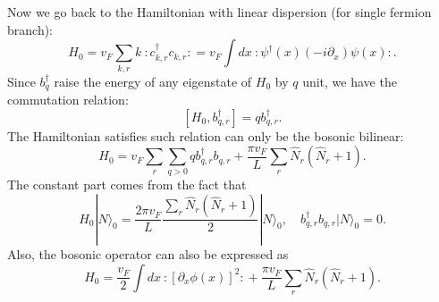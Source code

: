 Now we go back to the Hamiltonian with linear dispersion (for single fermion branch):
\begin{equation}
	H_0 = v_F \sum_{k,r} k\ {:\mathrel{c_{k,r}^\dagger c_{k,r}}:} 
	= v_F \int dx\ {:\mathrel{\psi^\dagger(x)(-i\partial_x)\psi(x)}:}.
\end{equation}
Since $b_q^\dagger$ raise the energy of any eigenstate of $H_0$ by $q$ unit, we have the commutation relation:
\begin{equation}
	\left[H_0,b_{q,r}^\dagger\right] = q b_{q,r}^\dagger.
\end{equation}
The Hamiltonian satisfies such relation can only be the bosonic bilinear:
\begin{equation}
	H_0 = v_F \sum_{r}\sum_{q>0} q b_{q,r}^\dagger b_{q,r} + \frac{\pi v_F}{L} \sum_r \hat{N}_r(\hat{N}_r+1).
\end{equation}
The constant part comes from the fact that
\begin{equation*}
	H_0|N\rangle_0 = \frac{2\pi v_F}{L} \frac{\sum_r\hat{N}_r(\hat{N}_r+1)}{2}|N\rangle_0, \quad
	b_{q,r}^\dagger b_{q,r} |N\rangle_0 = 0.
\end{equation*}
Also, the bosonic operator can also be expressed as
\begin{equation}
	H_0 = \frac{v_F}{2} \int dx\ {:\mathrel{[\partial_x \phi(x)]^2}:} + \frac{\pi v_F}{L}\sum_r \hat{N}_r(\hat{N}_r+1).
\end{equation}





